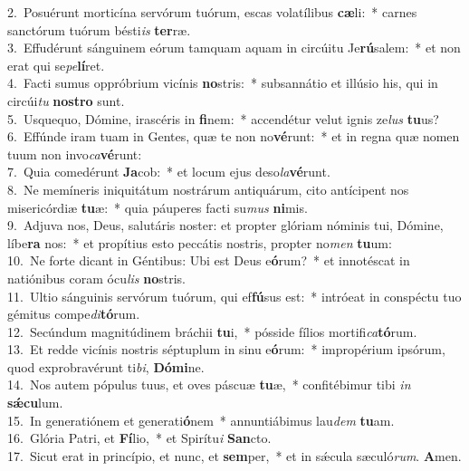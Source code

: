 {2.~}Posuérunt morticína servórum tuórum, escas volatílibus \textbf{cæ}li:~* carnes sanctórum tuórum bésti\textit{is} \textbf{ter}ræ.\\
{3.~}Effudérunt sánguinem eórum tamquam aquam in circúitu Je\textbf{rú}salem:~* et non erat qui se\textit{pe}\textbf{lí}ret.\\
{4.~}Facti sumus oppróbrium vicínis \textbf{no}stris:~* subsannátio et illúsio his, qui in circúi\textit{tu} \textbf{no}\textbf{stro} sunt.\\
{5.~}Usquequo, Dómine, irascéris in \textbf{fi}nem:~* accendétur velut ignis ze\textit{lus} \textbf{tu}us?\\
{6.~}Effúnde iram tuam in Gentes, quæ te non no\textbf{vé}runt:~* et in regna quæ nomen tuum non invo\textit{ca}\textbf{vé}runt:\\
{7.~}Quia comedérunt \textbf{Ja}cob:~* et locum ejus deso\textit{la}\textbf{vé}runt.\\
{8.~}Ne memíneris iniquitátum nostrárum antiquárum, cito antícipent nos misericórdiæ \textbf{tu}æ:~* quia páuperes facti su\textit{mus} \textbf{ni}mis.\\
{9.~}Adjuva nos, Deus, salutáris noster: et propter glóriam nóminis tui, Dómine, líbe\textbf{ra} nos:~* et propítius esto peccátis nostris, propter no\textit{men} \textbf{tu}um:\\
{10.~}Ne forte dicant in Géntibus: Ubi est Deus e\textbf{ó}rum?~* et innotéscat in natiónibus coram ócu\textit{lis} \textbf{no}stris.\\
{11.~}Ultio sánguinis servórum tuórum, qui ef\textbf{fú}sus est:~* intróeat in conspéctu tuo gémitus compe\textit{di}\textbf{tó}rum.\\
{12.~}Secúndum magnitúdinem bráchii \textbf{tu}i,~* pósside fílios mortifi\textit{ca}\textbf{tó}rum.\\
{13.~}Et redde vicínis nostris séptuplum in sinu e\textbf{ó}rum:~* impropérium ipsórum, quod exprobravérunt ti\textit{bi}, \textbf{Dó}\textbf{mi}ne.\\
{14.~}Nos autem pópulus tuus, et oves páscuæ \textbf{tu}æ,~* confitébimur tibi \textit{in} \textbf{sǽ}\textbf{cu}lum.\\
{15.~}In generatiónem et generati\textbf{ó}nem~* annuntiábimus lau\textit{dem} \textbf{tu}am.\\
{16.~}Glória Patri, et \textbf{Fí}lio,~* et Spirítu\textit{i} \textbf{San}cto.\\
{17.~}Sicut erat in princípio, et nunc, et \textbf{sem}per,~* et in sǽcula sæculó\textit{rum}. \textbf{A}men.\\
